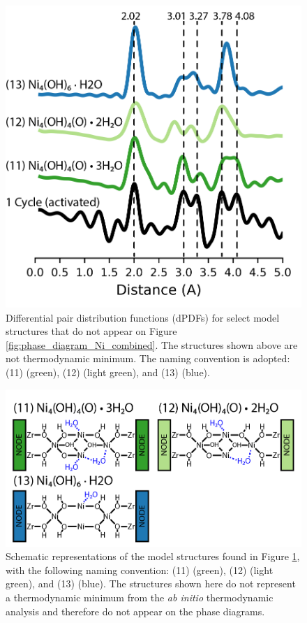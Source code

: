 \documentclass[journal=jctcce,manuscript=article]{achemso}
\begin{document}
\begin{figure}[H]
    \centering
    \includegraphics{zi-images/01-Ni-Graphics/2021-03-03-Ni-special-selection-dPDFs-manuscript.png}
    \caption{
    Differential pair distribution functions (dPDFs) for select model structures that do not appear on Figure \ref{fig:phase_diagram_Ni_combined}. The structures shown above are not thermodynamic minimum. The naming convention is adopted: (11)  (green), (12)  (light green), and (13)  (blue).
    }
    \label{fig:dPDF-Ni-special}
\end{figure}

\begin{figure}[H]
    \centering
    \includegraphics{zi-images/01-Ni-Graphics/2021-figure-structure-Ni-transformations_manuscript-additional-structures.png}
    \caption{
    Schematic representations of the model structures found in Figure \ref{fig:dPDF-Ni-special}, with the following naming convention: (11)  (green), (12)  (light green), and (13)  (blue). The structures shown here do not represent a thermodynamic minimum from the \textit{ab initio} thermodynamic analysis and therefore do not appear on the phase diagrams. 
    }
    \label{fig:Ni-special-structures}
\end{figure}
\end{document}
